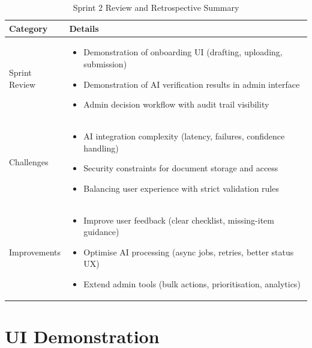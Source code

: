 \documentclass[a4paper,12pt]{report}
\renewcommand{\arraystretch}{1.25}
\begin{document}
\renewcommand{\arraystretch}{1.4}
\begin{table}[H]
\centering
\begin{tabularx}{\textwidth}{|l|X|}
\hline
\rowcolor{medgray}
\textbf{Category} & \textbf{Details} \\ \hline

Sprint Review &
\begin{itemize}
    \item Demonstration of onboarding UI (drafting, uploading, submission)
    \item Demonstration of AI verification results in admin interface
    \item Admin decision workflow with audit trail visibility
\end{itemize} \\ \hline

Challenges &
\begin{itemize}
    \item AI integration complexity (latency, failures, confidence handling)
    \item Security constraints for document storage and access
    \item Balancing user experience with strict validation rules
\end{itemize} \\ \hline

Improvements &
\begin{itemize}
    \item Improve user feedback (clear checklist, missing-item guidance)
    \item Optimise AI processing (async jobs, retries, better status UX)
    \item Extend admin tools (bulk actions, prioritisation, analytics)
\end{itemize} \\ \hline

\end{tabularx}
\caption{Sprint 2 Review and Retrospective Summary}
\end{table}
\section{UI Demonstration}
\label{sec:sprint2-ui-demo}
\end{document}
